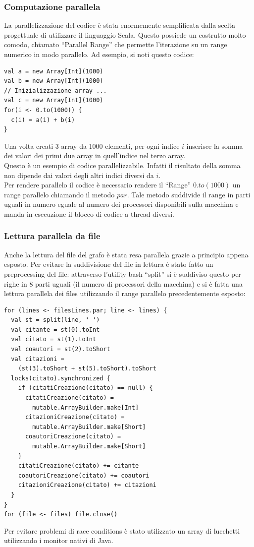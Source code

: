\documentclass[a4paper, 12pt]{article}
\begin{document}
\subsubsection{Computazione parallela}
La parallelizzazione del codice è stata enormemente semplificata dalla scelta progettuale di utilizzare il linguaggio Scala. Questo possiede un costrutto molto comodo, chiamato ``Parallel Range'' \cite{parallel} che permette l'iterazione su un range numerico in modo parallelo.
Ad esempio, si noti questo codice:
\begin{lstlisting}[keepspaces=true]
val a = new Array[Int](1000)
val b = new Array[Int](1000)
// Inizializzazione array ...
val c = new Array[Int](1000)
for(i <- 0.to(1000)) {
  c(i) = a(i) + b(i)
}
\end{lstlisting}
Una volta creati 3 array da 1000 elementi, per ogni indice $i$ inserisce la somma dei valori dei primi due array in quell'indice nel terzo array. \\
Questo è un esempio di codice parallelizzabile. Infatti il risultato della somma non dipende dai valori degli altri indici diversi da $i$. \\
Per rendere parallelo il codice è necessario rendere il ``Range'' $0.to(1000)$ un range parallelo chiamando il metodo $par$. Tale metodo suddivide il range in parti uguali in numero eguale al numero dei processori disponibili sulla macchina e manda in esecuzione il blocco di codice a thread diversi.
\subsubsection{Lettura parallela da file}
Anche la lettura del file del grafo è stata resa parallela grazie a principio appena esposto. Per evitare la suddivisione del file in lettura è stato fatto un preprocessing del file: attraverso l'utility bash ``split'' \cite{split} si è suddiviso questo per righe in 8 parti uguali (il numero di processori della macchina) e si è fatta una lettura parallela dei files utilizzando il range parallelo precedentemente esposto:
\begin{lstlisting}[keepspaces=true]
for (lines <- filesLines.par; line <- lines) {
  val st = split(line, ' ')
  val citante = st(0).toInt
  val citato = st(1).toInt
  val coautori = st(2).toShort
  val citazioni =
    (st(3).toShort + st(5).toShort).toShort
  locks(citato).synchronized {
    if (citatiCreazione(citato) == null) {
      citatiCreazione(citato) =
        mutable.ArrayBuilder.make[Int]
      citazioniCreazione(citato) = 
        mutable.ArrayBuilder.make[Short]
      coautoriCreazione(citato) =
        mutable.ArrayBuilder.make[Short]
    }
    citatiCreazione(citato) += citante
    coautoriCreazione(citato) += coautori
    citazioniCreazione(citato) += citazioni
  }
}
for (file <- files) file.close()
\end{lstlisting}
Per evitare problemi di race conditions è stato utilizzato un array di lucchetti utilizzando i monitor nativi di Java.
\end{document}
